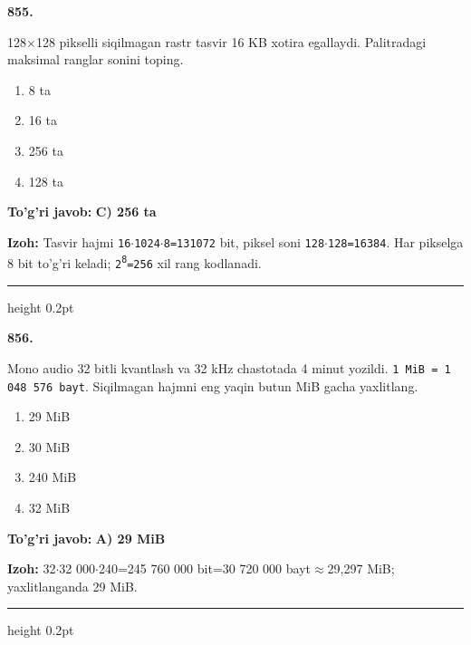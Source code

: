 \documentclass[10pt,a4paper,oneside]{article}
\begin{document}
\noindent\textbf{\color{ink}855.}
\par
128\ensuremath{\times}128 pikselli siqilmagan rastr tasvir 16 KB xotira egallaydi. Palitradagi maksimal ranglar sonini toping.
\begin{enumerate}[label=\Alph*),leftmargin=9mm]
\item 8 ta
\item 16 ta
\item 256 ta
\item 128 ta
\end{enumerate}
\begin{tcolorbox}[enhanced,breakable,colback=teal!4,colframe=teal!50!black,boxrule=0.5pt,arc=1.1mm,left=3mm,right=3mm,top=1.7mm,bottom=1.7mm,before skip=2mm,after skip=2mm]
\textbf{\color{teal}To'g'ri javob:} \textbf{C) 256 ta}
\par\smallskip
\textbf{Izoh:} Tasvir hajmi \texttt{16\ensuremath{\cdot}1024\ensuremath{\cdot}8=131072} bit, piksel soni \texttt{128\ensuremath{\cdot}128=16384}. Har pikselga 8 bit to'g'ri keladi; \texttt{2\textsuperscript{8}=256} xil rang kodlanadi.
\end{tcolorbox}
\vspace{2mm}\hrule height 0.2pt \vspace{3mm}

\noindent\textbf{\color{ink}856.}
\par
Mono audio 32 bitli kvantlash va 32 kHz chastotada 4 minut yozildi. \texttt{1 MiB = 1 048 576 bayt}. Siqilmagan hajmni eng yaqin butun MiB gacha yaxlitlang.
\begin{enumerate}[label=\Alph*),leftmargin=9mm]
\item 29 MiB
\item 30 MiB
\item 240 MiB
\item 32 MiB
\end{enumerate}
\begin{tcolorbox}[enhanced,breakable,colback=teal!4,colframe=teal!50!black,boxrule=0.5pt,arc=1.1mm,left=3mm,right=3mm,top=1.7mm,bottom=1.7mm,before skip=2mm,after skip=2mm]
\textbf{\color{teal}To'g'ri javob:} \textbf{A) 29 MiB}
\par\smallskip
\textbf{Izoh:} 32\ensuremath{\cdot}32 000\ensuremath{\cdot}240=245 760 000 bit=30 720 000 bayt\ensuremath{\approx}29,297 MiB; yaxlitlanganda 29 MiB.
\end{tcolorbox}
\vspace{2mm}\hrule height 0.2pt \vspace{3mm}
\end{document}
